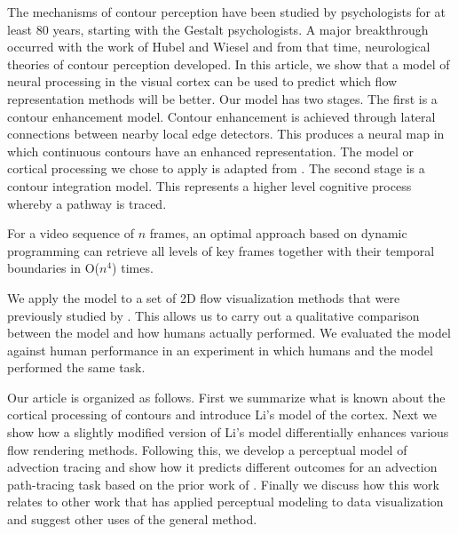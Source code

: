 The mechanisms of contour perception have been studied by
psychologists for at least 80 years, starting with the Gestalt
psychologists. A major breakthrough occurred with the work of Hubel
and Wiesel \citeyear{Hubel1962,Hubel1968} and from that time,
neurological theories of contour perception developed. In this
article, we show that a model of neural processing in the visual
cortex  can be used to predict which flow representation methods will
be better. Our model has two stages. The first is a contour
enhancement model. Contour enhancement is achieved through lateral
connections between nearby local edge detectors. This produces a
neural map in which continuous contours have an enhanced
representation. The model or cortical processing we chose to apply is
adapted from . The second stage is a contour
integration model. This represents a higher level cognitive process
whereby a pathway is traced.
\begin{theorem}
For a video sequence of $n$ frames, an optimal approach based on
dynamic programming can retrieve all levels of key frames together
with their temporal boundaries in O($n^4$) times.
\end{theorem}

We apply the model to a set of 2D flow visualization methods that
were previously studied by . This allows us to
carry out a qualitative comparison between the model and how humans
actually performed. We evaluated the model against human performance
in an experiment in which humans and the model performed the same task.

Our article is organized as follows. First we summarize what is
known about the cortical processing of contours and introduce Li's
\citeyear{Li1998a} model of the cortex. Next we show how a slightly
modified version of Li's model differentially enhances various flow
rendering methods. Following this, we develop a perceptual model of
advection tracing and show how it predicts different outcomes for an
advection path-tracing task based on the prior work of
. Finally we discuss how this work relates to
other work that has applied perceptual modeling to data visualization
and suggest other uses of the general method.

